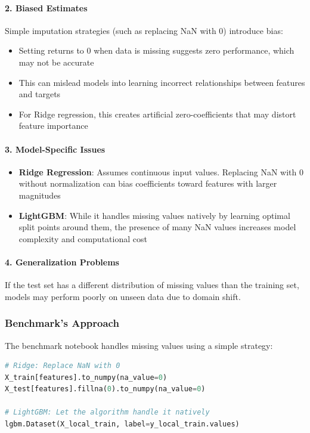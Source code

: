 \paragraph{2. Biased Estimates}
Simple imputation strategies (such as replacing NaN with 0) introduce bias:
\begin{itemize}
    \item Setting returns to 0 when data is missing suggests zero performance, which may not be accurate
    \item This can mislead models into learning incorrect relationships between features and targets
    \item For Ridge regression, this creates artificial zero-coefficients that may distort feature importance
\end{itemize}

\paragraph{3. Model-Specific Issues}

\begin{itemize}
    \item \textbf{Ridge Regression}: Assumes continuous input values. Replacing NaN with 0 without normalization can bias coefficients toward features with larger magnitudes
    \item \textbf{LightGBM}: While it handles missing values natively by learning optimal split points around them, the presence of many NaN values increases model complexity and computational cost
\end{itemize}

\paragraph{4. Generalization Problems}
If the test set has a different distribution of missing values than the training set, models may perform poorly on unseen data due to domain shift.

\subsubsection{Benchmark's Approach}

The benchmark notebook handles missing values using a simple strategy:

\begin{lstlisting}[language=Python, breaklines=true]
# Ridge: Replace NaN with 0
X_train[features].to_numpy(na_value=0)
X_test[features].fillna(0).to_numpy(na_value=0)

# LightGBM: Let the algorithm handle it natively
lgbm.Dataset(X_local_train, label=y_local_train.values)
\end{lstlisting}

